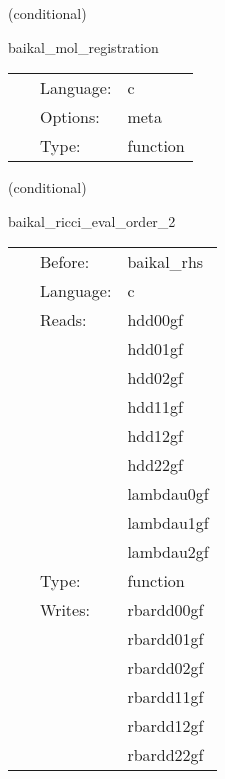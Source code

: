 \vspace{5mm}

   (conditional) 

\hspace{5mm} baikal\_mol\_registration 

\hspace{5mm}{\it register variables for mol } 


\hspace{5mm}

 \begin{tabular*}{160mm}{cll} 
~ & Language:  & c \\ 
~ & Options:  & meta \\ 
~ & Type:  & function \\ 
\end{tabular*} 


\vspace{5mm}

   (conditional) 

\hspace{5mm} baikal\_ricci\_eval\_order\_2 

\hspace{5mm}{\it compute ricci tensor, needed for bssn rhss, at finite-differencing order 2 } 


\hspace{5mm}

 \begin{tabular*}{160mm}{cll} 
~ & Before:  & baikal\_rhs \\ 
~ & Language:  & c \\ 
~ & Reads:  & hdd00gf \\ 
~& ~ &hdd01gf\\ 
~& ~ &hdd02gf\\ 
~& ~ &hdd11gf\\ 
~& ~ &hdd12gf\\ 
~& ~ &hdd22gf\\ 
~& ~ &lambdau0gf\\ 
~& ~ &lambdau1gf\\ 
~& ~ &lambdau2gf\\ 
~ & Type:  & function \\ 
~ & Writes:  & rbardd00gf \\ 
~& ~ &rbardd01gf\\ 
~& ~ &rbardd02gf\\ 
~& ~ &rbardd11gf\\ 
~& ~ &rbardd12gf\\ 
~& ~ &rbardd22gf\\ 
\end{tabular*} 


